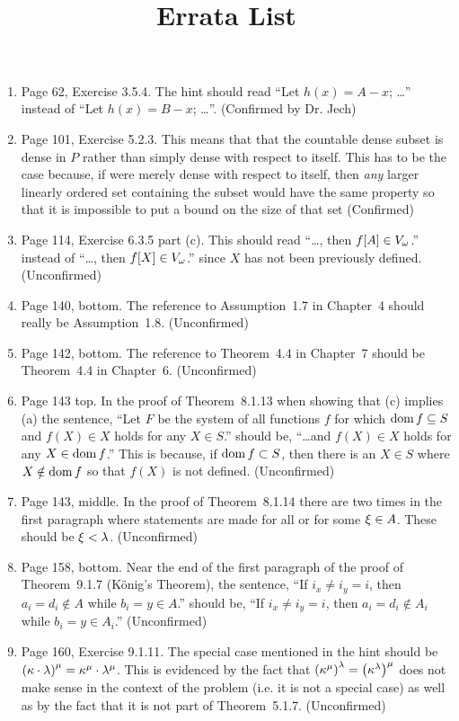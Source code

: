 \documentclass{report}
\title{
  \booktitle \\
  \ \\
  Errata List
}
\begin{document}
\maketitle

\begin{enumerate}

\item Page 62, Exercise 3.5.4.
  The hint should read ``Let $h(x) = A - x$; \ldots'' instead of ``Let $h(x) = B - x$; \ldots''.
  (Confirmed by Dr. Jech)

\item Page 101, Exercise 5.2.3.
  This means that that the countable dense subset is dense in $P$ rather than simply dense with respect to itself.
  This has to be the case because, if were merely dense with respect to itself, then \emph{any} larger linearly ordered set containing the subset would have the same property so that it is impossible to put a bound on the size of that set (Confirmed)

\item Page 114, Exercise 6.3.5 part (c).
  This should read ``\ldots, then $f[A] \in V_\omega$.'' instead of ``\ldots, then $f[X] \in V_\omega$.'' since $X$ has not been previously defined.
  (Unconfirmed)

\item Page 140, bottom.
  The reference to Assumption~1.7 in Chapter~4 should really be Assumption~1.8.
  (Unconfirmed)

\item Page 142, bottom.
  The reference to Theorem~4.4 in Chapter~7 should be Theorem~4.4 in Chapter~6.
  (Unconfirmed)

\item Page 143 top.
  In the proof of Theorem~8.1.13 when showing that (c) implies (a) the sentence, ``Let $F$ be the system of all functions $f$ for which $\mathrm{dom}\,{f} \subseteq S$ and $f(X) \in X$ holds for any $X \in S$.'' should be, ``\ldots and $f(X) \in X$ holds for any $X \in \mathrm{dom}\,{f}$.''
  This is because, if $\mathrm{dom}\,{f} \subset S$, then there is an $X \in S$ where $X \notin \mathrm{dom}\,{f}$ so that $f(X)$ is not defined.
  (Unconfirmed)

\item Page 143, middle.
  In the proof of Theorem~8.1.14 there are two times in the first paragraph where statements are made for all or for some $\xi \in A$.
  These should be $\xi < \lambda$.
  (Unconfirmed)

\item Page 158, bottom.
  Near the end of the first paragraph of the proof of Theorem~9.1.7 (K{\"o}nig's Theorem), the sentence, ``If $i_x \neq i_y = i$, then $a_i = d_i \notin A$ while $b_i = y \in A$.'' should be, ``If $i_x \neq i_y = i$, then $a_i = d_i \notin A_i$ while $b_i = y \in A_i$.''
  (Unconfirmed)

\item Page 160, Exercise 9.1.11.
  The special case mentioned in the hint should be $\left( \kappa \cdot \lambda \right)^\mu = \kappa^\mu \cdot \lambda^\mu$.
  This is evidenced by the fact that $\left( \kappa^\mu \right)^\lambda = \left( \kappa^\lambda \right)^\mu$ does not make sense in the context of the problem (i.e. it is not a special case) as well as by the fact that it is not part of Theorem~5.1.7.
  (Unconfirmed)

\end{enumerate}
\end{document}
